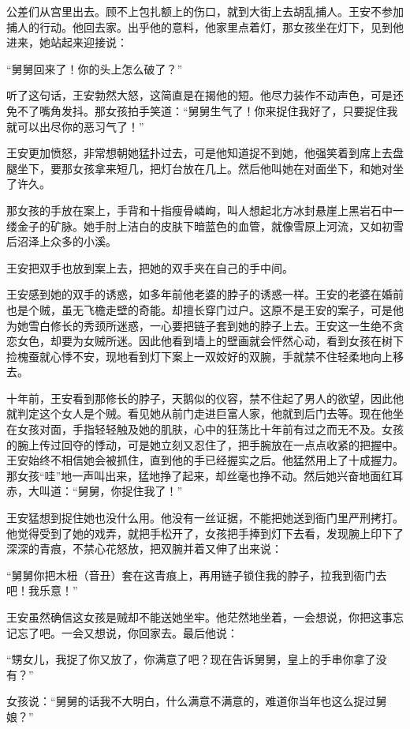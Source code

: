 公差们从宫里出去。顾不上包扎额上的伤口，就到大街上去胡乱捕人。王安不参加捕人的行动。他回去家。出乎他的意料，他家里点着灯，那女孩坐在灯下，见到他进来，她站起来迎接说： 

“舅舅回来了！你的头上怎么破了？” 

听了这句话，王安勃然大怒，这简直是在揭他的短。他尽力装作不动声色，可是还免不了嘴角发抖。那女孩拍手笑道：“舅舅生气了！你来捉住我好了，只要捉住我就可以出尽你的恶习气了！” 

王安更加愤怒，非常想朝她猛扑过去，可是他知道捉不到她，他强笑着到席上去盘腿坐下，要那女孩拿来短几，把灯台放在几上。然后他叫她在对面坐下，和她对坐了许久。 

那女孩的手放在案上，手背和十指瘦骨嶙峋，叫人想起北方冰封悬崖上黑岩石中一缕金子的矿脉。她手肘上洁白的皮肤下暗蓝色的血管，就像雪原上河流，又如初雪后沼泽上众多的小溪。 

王安把双手也放到案上去，把她的双手夹在自己的手中间。 

王安感到她的双手的诱惑，如多年前他老婆的脖子的诱惑一样。王安的老婆在婚前也是个贼，虽无飞檐走壁的奇能。却擅长穿门过户。这原不是王安的案子，可是他为她雪白修长的秀颈所迷惑，一心要把链子套到她的脖子上去。王安这一生绝不贪恋女色，却要为女贼所迷。因此他看到墙上的壁画就会怦然心动，看到女孩在树下捡槐蚕就心悸不安，现地看到灯下案上一双姣好的双腕，手就禁不住轻柔地向上移去。 

十年前，王安看到那修长的脖子，天鹅似的仪容，禁不住起了男人的欲望，因此他就判定这个女人是个贼。看见她从前门走进巨富人家，他就到后门去等。现在他坐在女孩对面，手指轻轻触及她的肌肤，心中的狂荡比十年前有过之而无不及。女孩的腕上传过回夺的悸动，可是她立刻又忍住了，把手腕放在一点点收紧的把握中。王安始终不相信她会被抓住，直到他的手已经握实之后。他猛然用上了十成握力。那女孩“哇”地一声叫出来，猛地挣了起来，却丝毫也挣不动。然后她兴奋地面红耳赤，大叫道：“舅舅，你捉住我了！” 

王安猛想到捉住她也没什么用。他没有一丝证据，不能把她送到衙门里严刑拷打。他觉得受到了她的戏弄，就把手松开了，女孩把手捧到灯下去看，发现腕上印下了深深的青痕，不禁心花怒放，把双腕并着又伸了出来说： 

“舅舅你把木杻（音丑）套在这青痕上，再用链子锁住我的脖子，拉我到衙门去吧！我乐意！” 

王安虽然确信这女孩是贼却不能送她坐牢。他茫然地坐着，一会想说，你把这事忘记忘了吧。一会又想说，你回家去。最后他说： 

“甥女儿，我捉了你又放了，你满意了吧？现在告诉舅舅，皇上的手串你拿了没有？” 

女孩说：“舅舅的话我不大明白，什么满意不满意的，难道你当年也这么捉过舅娘？” 

